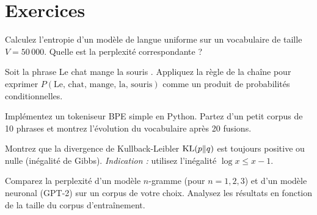 \section{Exercices}
\label{sec:intro:exercices}

\begin{exercice}[$\star$]
Calculez l'entropie d'un mod\`ele de langue uniforme sur un vocabulaire de
taille $V = 50\,000$. Quelle est la perplexit\'e correspondante ?
\end{exercice}

\begin{exercice}[$\star$]
Soit la phrase \og Le chat mange la souris \fg. Appliquez la r\`egle de
la cha\^ine pour exprimer $P(\text{Le, chat, mange, la, souris})$ comme un
produit de probabilit\'es conditionnelles.
\end{exercice}

\begin{exercice}[$\star\star$]
Impl\'ementez un tokeniseur BPE simple en Python. Partez d'un petit corpus
de 10 phrases et montrez l'\'evolution du vocabulaire apr\`es 20 fusions.
\end{exercice}

\begin{exercice}[$\star\star$]
Montrez que la divergence de Kullback-Leibler $\mathrm{KL}(p \| q)$ est toujours
positive ou nulle (in\'egalit\'e de Gibbs). \emph{Indication :} utilisez
l'in\'egalit\'e $\log x \leq x - 1$.
\end{exercice}

\begin{exercice}[$\star\star\star$]
Comparez la perplexit\'e d'un mod\`ele $n$-gramme (pour $n = 1, 2, 3$) et
d'un mod\`ele neuronal (GPT-2) sur un corpus de votre choix. Analysez les
r\'esultats en fonction de la taille du corpus d'entra\^inement.
\end{exercice}
